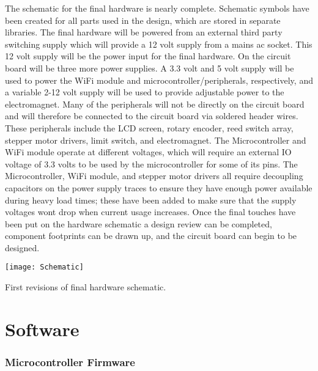 \documentclass{article}
\begin{document}
The schematic for the final hardware is nearly complete. Schematic symbols have been created for all parts used in the design, which are stored in separate libraries. The final hardware will be powered from an external third party switching supply which will provide a 12 volt supply from a mains ac socket. This 12 volt supply will be the power input for the final hardware. On the circuit board will be three more power supplies. A 3.3 volt and 5 volt supply will be used to power the WiFi module and microcontroller/peripherals, respectively, and a variable 2-12 volt supply will be used to provide adjustable power to the electromagnet. Many of the peripherals will not be directly on the circuit board and will therefore be connected to the circuit board via soldered header wires. These peripherals include the LCD screen, rotary encoder, reed switch array, stepper motor drivers, limit switch, and electromagnet. The Microcontroller and WiFi module operate at different voltages, which will require an external IO voltage of 3.3 volts to be used by the microcontroller for some of its pins. The Microcontroller, WiFi module, and stepper motor drivers all require decoupling capacitors on the power supply traces to ensure they have enough power available during heavy load times; these have been added to make sure that the supply voltages wont drop when current usage increases. Once the final touches have been put on the hardware schematic a design review can be completed, component footprints can be drawn up, and the circuit board can begin to be designed.

\centerline{\texttt{[image: Schematic]}}

\begin{center}
First revisions of final hardware schematic.
\end{center}


\section*{Software}

\subsubsection*{Microcontroller Firmware}
\indent
\end{document}
